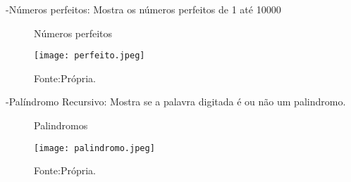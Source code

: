 -Números perfeitos:
Mostra os números perfeitos de 1 até 10000

\begin{figure} [h!]	
    \centering
    \caption{Números perfeitos}
    \texttt{[image: perfeito.jpeg]}
    \caption*{Fonte:Própria.}
    \label{fig:Numerosperfeitos}
\end{figure}

-Palíndromo Recursivo:
Mostra se a palavra digitada é ou não um palindromo.
\begin{figure} [h!]	
    \centering
    \caption{Palindromos}
    \texttt{[image: palindromo.jpeg]}
    \caption*{Fonte:Própria.}
    \label{fig:palindromo}
\end{figure}